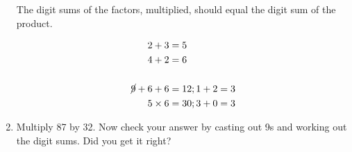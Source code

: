 \documentclass[12pt]{article}
\begin{document}
\begin{enumerate}
The digit sums of the factors, multiplied, should equal the digit sum of the product.\\

\begin{center}
\begin{align*}
2 + 3 &= 5\\
4 + 2 &= 6\\\\
\cancel{9} + 6 + 6 &= 12; 1 + 2 = 3\\
5 \times 6 &= 30; 3 + 0 = 3\\
\end{align*}
\end{center}

\item Multiply 87 by 32. Now check your answer by casting out 9s and working out the digit sums. Did you get it right?

\end{enumerate}
\end{document}
